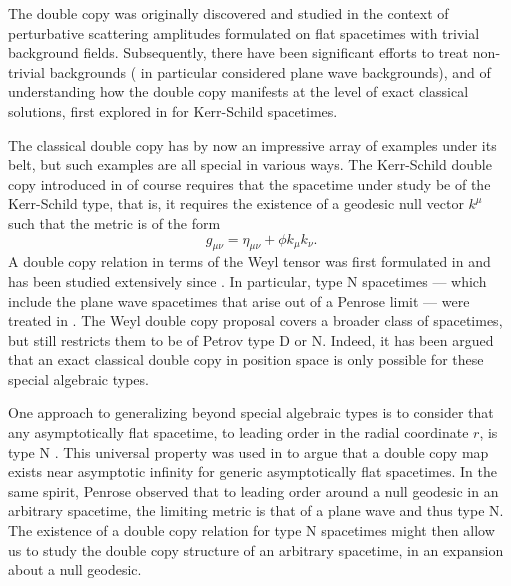 The double copy was originally discovered and studied in the context of perturbative scattering amplitudes
formulated on flat spacetimes with trivial background fields. Subsequently, there have been significant efforts
to treat non-trivial backgrounds \cite{Adamo:2017nia,Adamo:2023fbj,Sivaramakrishnan:2021srm,
Herderschee:2022ntr,Cheung:2022pdk,Ilderton:2024oly} (\cite{Adamo:2017qyl} in particular considered plane wave
backgrounds), and of understanding how the double copy manifests at the
level of exact classical solutions, first explored in \cite{Monteiro:2014cda} for Kerr-Schild spacetimes.

The classical double copy has by now an impressive array of examples
\cite{Luna:2016due,Luna:2015paa,Kim:2019jwm,Luna:2020adi,Luna:2018dpt,Godazgar:2021iae,Berman:2018hwd,Lee:2018gxc,Cho:2019ype,Cristofoli:2020hnk,Easson:2021asd,Easson:2022zoh,Easson:2020esh,Mkrtchyan:2022ulc,Ilderton:2018lsf,Barrientos:2024uuq,Ortaggio:2023cdz,Adamo:2022rob,Keeler:2020rcv,Keeler:2024bdt}
under its belt, but such examples are all special in various ways. The Kerr-Schild double copy introduced in
\cite{Monteiro:2014cda} of course requires that the spacetime under study be of the Kerr-Schild type, that is, it
requires the existence of a geodesic null vector $k^{\mu}$ such that the metric is of the form
\begin{equation} \ 
    g_{\mu \nu} = \eta_{\mu \nu} + \phi k_{\mu} k_{\nu}.
\end{equation}
A double copy relation in terms of the Weyl tensor was first formulated in \cite{Luna:2018dpt} and has
been studied extensively since
\cite{Godazgar:2020zbv,White:2020sfn,Chacon:2021wbr,Chacon:2021lox,Han:2022ubu,Alawadhi:2019urr,Alawadhi:2020jrv,Alkac:2023glx,Armstrong-Williams:2023ssz,Chawla:2022ogv,Mao:2023yle,Easson:2023dbk}.
In particular, type N spacetimes --- which include the plane wave spacetimes that arise out of a Penrose limit ---
were treated in \cite{Godazgar:2020zbv}.  The Weyl double copy proposal covers a broader class of spacetimes, but
still restricts them to be of Petrov type D or N. Indeed, it has been argued \cite{Luna:2022dxo} that an exact
classical double copy in position space is only possible for these special algebraic types.

One approach to generalizing beyond special algebraic types is to consider that any asymptotically flat spacetime,
to leading order in the radial coordinate $r$, is type N \cite{newman1968new}. This universal property was used in
\cite{Godazgar:2021iae,Adamo:2021dfg} to argue that a double copy map exists near asymptotic infinity for generic
asymptotically flat spacetimes. In the same spirit, Penrose observed that to leading order
around a null geodesic in an arbitrary spacetime, the limiting metric is that of a plane wave \cite{penrose1976any}
and thus type N. The existence of a double copy relation for type N spacetimes \cite{Godazgar:2020zbv} might then
allow us to study the double copy structure of an arbitrary spacetime, in an expansion about a null geodesic.

